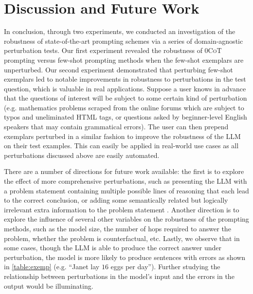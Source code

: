 \documentclass[11pt]{article}
\begin{document}
\section{Discussion and Future Work}

In conclusion, through two experiments, we conducted an investigation of the robustness of state-of-the-art prompting schemes via a series of domain-agnostic perturbation tests. Our first experiment revealed the robustness of \textsc{0CoT} prompting versus few-shot prompting methods when the few-shot exemplars are unperturbed. Our second experiment demonstrated that perturbing few-shot exemplars led to notable improvements in robustness to perturbations in the test question, which is valuable in real applications. Suppose a user knows in advance that the questions of interest will be subject to some certain kind of perturbation (e.g. mathematics problems scraped from the online forums which are subject to typos and uneliminated HTML tags, or questions asked by beginner-level English speakers that may contain grammatical errors). The user can then prepend exemplars perturbed in a similar fashion to improve the robustness of the LLM on their test examples. This can easily be applied in real-world use cases as all perturbations discussed above are easily automated. %

There are a number of directions for future work available: the first is to explore the effect of more comprehensive perturbations, such as presenting the LLM with a problem statement containing multiple possible lines of reasoning that each lead to the correct conclusion, or adding some semantically related but logically irrelevant extra information to the problem statement \cite{shi2023large}. Another direction is to explore the influence of several other variables on the robustness of the prompting methods, such as the model size, the number of hops required to answer the problem, whether the problem is counterfactual, etc. Lastly, we observe that in some cases, though the LLM is able to produce the correct answer under perturbation, the model is more likely to produce sentences with errors as shown in \autoref{table:exemp} (e.g. ``Janet lay $16$ eggs per day''). Further studying the relationship between perturbations in the model's input and the errors in the output would be illuminating. %
\end{document}

